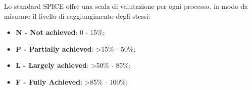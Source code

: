 	Lo standard SPICE offre una scala di valutazione per ogni processo, in modo da misurare il livello di raggiungimento degli stessi:
	\begin{itemize}
	\item \textbf{N - Not achieved}: 0 - 15\%;
	\item \textbf{P - Partially achieved}: >15\% - 50\%;
	\item \textbf{L - Largely achieved}: >50\% - 85\%;
	\item \textbf{F - Fully Achieved}: >85\% - 100\%;
	\end{itemize}


\pagebreak